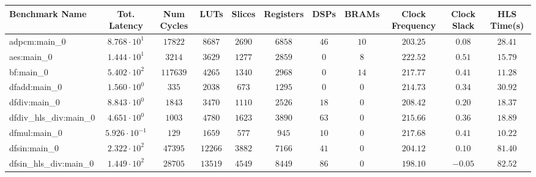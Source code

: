 \begin{tabular}{|l|c|c|c|c|c|c|c|c|c|c|}
\hline
Benchmark Name          & Tot. Latency            & Num Cycles & LUTs      & Slices    & Registers & DSPs    & BRAMs   & Clock Frequency & Clock Slack & HLS Time(s) \\
\hline
adpcm:main\_0           & $ 8.768 \cdot 10^{1}  $ & $ 17822  $ & $ 8687  $ & $ 2690  $ & $ 6858  $ & $ 46  $ & $ 10  $ & $ 203.25      $ & $ 0.08    $ & $ 28.41   $ \\
aes:main\_0             & $ 1.444 \cdot 10^{1}  $ & $ 3214   $ & $ 3629  $ & $ 1277  $ & $ 2859  $ & $ 0   $ & $ 8   $ & $ 222.52      $ & $ 0.51    $ & $ 15.79   $ \\
bf:main\_0              & $ 5.402 \cdot 10^{2}  $ & $ 117639 $ & $ 4265  $ & $ 1340  $ & $ 2968  $ & $ 0   $ & $ 14  $ & $ 217.77      $ & $ 0.41    $ & $ 11.28   $ \\
dfadd:main\_0           & $ 1.560 \cdot 10^{0}  $ & $ 335    $ & $ 2038  $ & $ 673   $ & $ 1295  $ & $ 0   $ & $ 0   $ & $ 214.73      $ & $ 0.34    $ & $ 30.92   $ \\
dfdiv:main\_0           & $ 8.843 \cdot 10^{0}  $ & $ 1843   $ & $ 3470  $ & $ 1110  $ & $ 2526  $ & $ 18  $ & $ 0   $ & $ 208.42      $ & $ 0.20    $ & $ 18.37   $ \\
dfdiv\_hls\_div:main\_0 & $ 4.651 \cdot 10^{0}  $ & $ 1003   $ & $ 4780  $ & $ 1623  $ & $ 3890  $ & $ 63  $ & $ 0   $ & $ 215.66      $ & $ 0.36    $ & $ 18.89   $ \\
dfmul:main\_0           & $ 5.926 \cdot 10^{-1} $ & $ 129    $ & $ 1659  $ & $ 577   $ & $ 945   $ & $ 10  $ & $ 0   $ & $ 217.68      $ & $ 0.41    $ & $ 10.22   $ \\
dfsin:main\_0           & $ 2.322 \cdot 10^{2}  $ & $ 47395  $ & $ 12266 $ & $ 3882  $ & $ 7166  $ & $ 41  $ & $ 0   $ & $ 204.12      $ & $ 0.10    $ & $ 81.40   $ \\
dfsin\_hls\_div:main\_0 & $ 1.449 \cdot 10^{2}  $ & $ 28705  $ & $ 13519 $ & $ 4549  $ & $ 8449  $ & $ 86  $ & $ 0   $ & $ 198.10      $ & $ -0.05   $ & $ 82.52   $ \\

\end{tabular}

